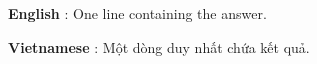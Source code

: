 \textbf{    English   }   : One line containing the answer.  

\textbf{    Vietnamese   }   : Một dòng duy nhất chứa kết quả.